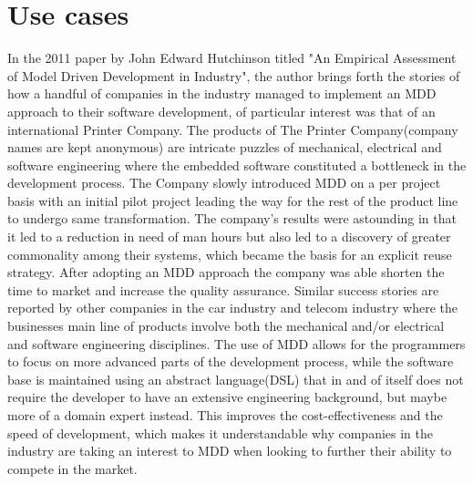 \section{Use cases}
\label{usecases}

\label{Use cases}
In the 2011 paper by John Edward Hutchinson titled "An Empirical Assessment of Model Driven Development in Industry", the author brings forth the stories of how a handful of companies in the industry managed to implement an MDD approach to their software development, of particular interest was that of an international Printer Company.
The products of The Printer Company(company names are kept anonymous) are intricate puzzles of mechanical, electrical and software engineering where the embedded software constituted a bottleneck in the development process. The Company slowly introduced MDD on a per project basis with an initial pilot project leading the way for the rest of the product line to undergo same transformation. 
The company's results were astounding in that it led to a reduction in need of man hours but also led to a discovery of greater commonality among their systems, which became the basis for an explicit reuse strategy. After adopting an MDD approach the company was able shorten the time to market and increase the quality assurance.
Similar success stories are reported by other companies in the car industry and telecom industry where the businesses main line of products involve both the mechanical and/or electrical and software engineering disciplines. The use of MDD allows for the programmers to focus on more advanced parts of the development process, while the software base is maintained using an abstract language(DSL) that in and of itself does not require the developer to have an extensive engineering background, but maybe more of a domain expert instead.
This improves the cost-effectiveness and the speed of development, which makes it understandable why companies in the industry are taking an interest to MDD when looking to further their ability to compete in the market.
